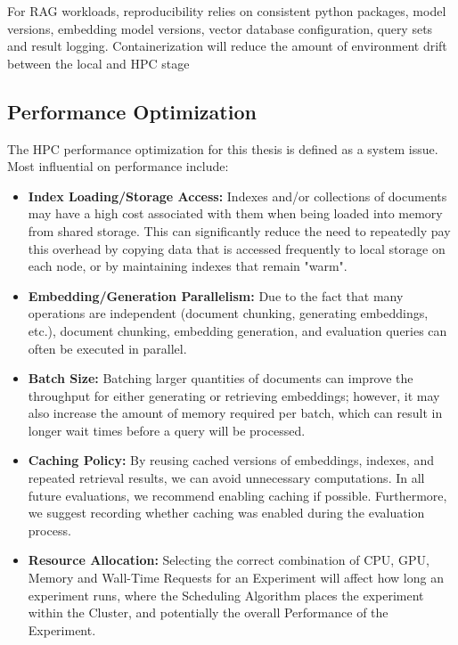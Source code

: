 For \ac{RAG} workloads, reproducibility relies on consistent python packages, model versions, embedding model versions, vector database configuration, query sets and result logging. Containerization will reduce the amount of environment drift between the local and \ac{HPC} stage

\subsection{Performance Optimization}

The HPC performance optimization for this thesis is defined as a system issue. 
Most influential on performance include:

\begin{itemize}
    \item \textbf{Index Loading/Storage Access:} Indexes and/or collections of documents may have a high cost associated with them when being loaded into memory from shared storage. This can significantly reduce the need to repeatedly pay this overhead by copying data that is accessed frequently to local storage on each node, or by maintaining indexes that remain "warm".
    \item \textbf{Embedding/Generation Parallelism:} Due to the fact that many operations are independent (document chunking, generating embeddings, etc.), document chunking, embedding generation, and evaluation queries can often be executed in parallel.
    \item \textbf{Batch Size:} Batching larger quantities of documents can improve the throughput for either generating or retrieving embeddings; however, it may also increase the amount of memory required per batch, which can result in longer wait times before a query will be processed.
    \item \textbf{Caching Policy:} By reusing cached versions of embeddings, indexes, and repeated retrieval results, we can avoid unnecessary computations. In all future evaluations, we recommend enabling caching if possible. Furthermore, we suggest recording whether caching was enabled during the evaluation process.
    \item \textbf{Resource Allocation:} Selecting the correct combination of \ac{CPU}, \ac{GPU}, Memory and Wall-Time Requests for an Experiment will affect how long an experiment runs, where the Scheduling Algorithm places the experiment within the Cluster, and potentially the overall Performance of the Experiment.
\end{itemize}

